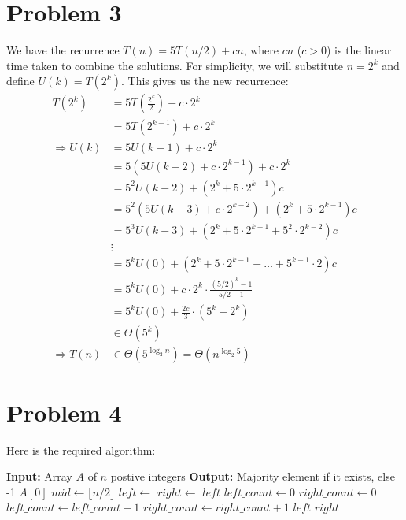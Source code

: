 \documentclass{article}
\begin{document}
\section{Problem 3}
  We have the recurrence $T(n) = 5T(n/2) + cn$, where $cn$ ($c > 0$) is the linear time taken to combine the solutions.
  For simplicity, we will substitute $n = 2^k$ and define $U(k) = T(2^k)$.
  This gives us the new recurrence:
  \begin{align*}
    T(2^k) &= 5T\left(\frac{2^k}{2}\right) + c \cdot 2^k \\
    &= 5T(2^{k - 1}) + c \cdot 2^k \\
    \Rightarrow U(k) &= 5U(k - 1) + c \cdot 2^k \\
    &= 5(5U(k - 2) + c \cdot 2^{k - 1}) + c \cdot 2^k \\
    &= 5^2 U(k - 2) + (2^k + 5 \cdot 2^{k - 1})c \\
    &= 5^2 (5U(k - 3) + c \cdot 2^{k - 2}) + (2^k + 5 \cdot 2^{k - 1})c \\
    &= 5^3 U(k - 3) + (2^k + 5 \cdot 2^{k - 1} + 5^2 \cdot 2^{k - 2})c \\
    &\vdots \\
    &= 5^k U(0) + (2^k + 5 \cdot 2^{k - 1} + \ldots + 5^{k - 1} \cdot 2)c \\
    &= 5^k U(0) + c \cdot 2^k \cdot \frac{(5/2)^k - 1}{5/2 - 1} \\
    &= 5^k U(0) + \frac{2c}{3} \cdot (5^k - 2^k) \\
    &\in \Theta(5^k) \\
    \Rightarrow T(n) &\in \Theta(5^{\log_2 n}) = \Theta(n^{\log_2 5})
  \end{align*}

\section{Problem 4}
  Here is the required algorithm:
  \begin{algorithm}
    \caption{Determine if an array has a majority element}
    \begin{algorithmic}
      \State \textbf{Input:} Array $A$ of $n$ postive integers
      \State \textbf{Output:} Majority element if it exists, else -1
          \State \Return $A[0]$
        \EndIf
        \State $mid \gets \lfloor n / 2 \rfloor$
        \State $left \gets$ 
        \State $right \gets$ 
          \State \Return $left$
        \EndIf
        \State $left\_count \gets 0$
        \State $right\_count \gets 0$
            \State $left\_count \gets left\_count + 1$
            \State $right\_count \gets right\_count + 1$
          \EndIf
        \EndFor
          \State \Return $left$
          \State \Return $right$
        \Else
          \State {}
        \EndIf
      \EndFunction
    \end{algorithmic}
  \end{algorithm}
\end{document}
